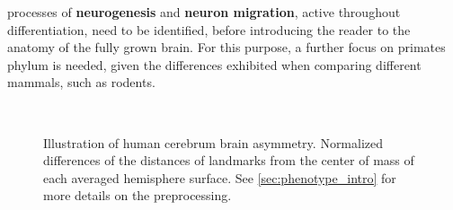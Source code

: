 processes of \textbf{neurogenesis} and  \textbf{neuron migration}, active throughout differentiation, need to be identified, before introducing the reader to the anatomy of the fully grown brain. For this purpose, a further focus on primates phylum is needed, given the differences exhibited when comparing different mammals, such as rodents\cite{Molnar2019}.


\begin{figure}
	\centering
	\\
	\caption[Human cerebrum brain asymmetry]{Illustration of human cerebrum brain asymmetry. Normalized differences of the distances of landmarks from the center of mass of each averaged hemisphere surface. See \autoref{sec:phenotype_intro} for more details on the preprocessing.}
	\label{fig:brainlat}
\end{figure}

